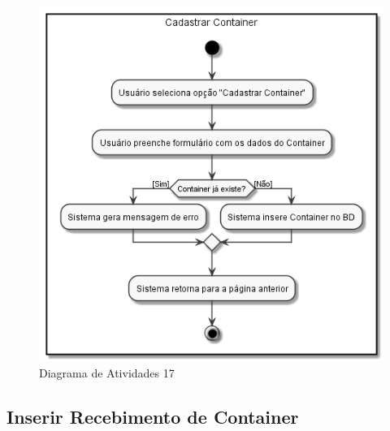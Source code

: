 \documentclass[rascunho,xindy,acronym,symbols]{fei}
\begin{document}
\begin{figure}[H]
    \centering
    \includegraphics[scale=0.6, width=400pt]{./Images/Cadastrar_Container.png}
    \caption{Diagrama de Atividades 17}
    \label{fig:diag_atv17}
\end{figure}

\subsection{Inserir Recebimento de Container}
\end{document}
